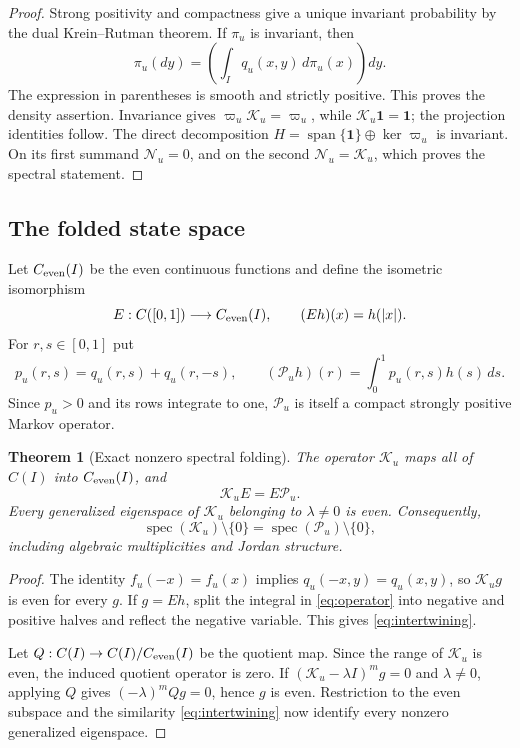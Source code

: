 \documentclass[11pt]{article}
\newtheorem{theorem}{Theorem}[section]
\theoremstyle{definition}
\theoremstyle{remark}
\newcommand{\cK}{\mathcal K}
\newcommand{\cP}{\mathcal P}
\newcommand{\cN}{\mathcal N}
\newcommand{\spec}{\operatorname{spec}}
\newcommand{\one}{\mathbf 1}
\begin{document}
\begin{proof}
Strong positivity and compactness give a unique invariant probability by the
dual Krein--Rutman theorem.  If $\pi_u$ is invariant, then
\[
 \pi_u(dy)=\left(\int_Iq_u(x,y)\,d\pi_u(x)\right)dy.
\]
The expression in parentheses is smooth and strictly positive.  This proves
the density assertion.  Invariance gives $\varpi_u\cK_u=\varpi_u$, while
$\cK_u\one=\one$; the projection identities follow.  The direct decomposition
$H=\operatorname{span}\{\one\}\oplus\ker\varpi_u$ is invariant.  On its first
summand $\cN_u=0$, and on the second $\cN_u=\cK_u$, which proves the spectral
statement.
\end{proof}

\subsection{The folded state space}

Let $C_{\rm even}(I)$ be the even continuous functions and define the
isometric isomorphism
\[
 E:C([0,1])\longrightarrow C_{\rm even}(I),
 \qquad (Eh)(x)=h(|x|).
\]
For $r,s\in[0,1]$ put
\begin{equation}\label{eq:folded-kernel}
 p_u(r,s)=q_u(r,s)+q_u(r,-s),
 \qquad
 (\cP_u h)(r)=\int_0^1p_u(r,s)h(s)\,ds.
\end{equation}
Since $p_u>0$ and its rows integrate to one, $\cP_u$ is itself a compact
strongly positive Markov operator.

\begin{theorem}[Exact nonzero spectral folding]
\label{thm:folding}
The operator $\cK_u$ maps all of $C(I)$ into $C_{\rm even}(I)$, and
\begin{equation}\label{eq:intertwining}
 \cK_uE=E\cP_u.
\end{equation}
Every generalized eigenspace of $\cK_u$ belonging to $\lambda\ne0$ is even.
Consequently,
\begin{equation}\label{eq:folded-spectrum}
 \spec(\cK_u)\setminus\{0\}
 =\spec(\cP_u)\setminus\{0\},
\end{equation}
including algebraic multiplicities and Jordan structure.
\end{theorem}

\begin{proof}
The identity $f_u(-x)=f_u(x)$ implies
$q_u(-x,y)=q_u(x,y)$, so $\cK_ug$ is even for every $g$.  If $g=Eh$, split
the integral in \eqref{eq:operator} into negative and positive halves and
reflect the negative variable.  This gives \eqref{eq:intertwining}.

Let $Q:C(I)\to C(I)/C_{\rm even}(I)$ be the quotient map.  Since the range of
$\cK_u$ is even, the induced quotient operator is zero.  If
$(\cK_u-\lambda I)^m g=0$ and $\lambda\ne0$, applying $Q$ gives
$(-\lambda)^mQg=0$, hence $g$ is even.  Restriction to the even subspace and
the similarity \eqref{eq:intertwining} now identify every nonzero generalized
eigenspace.
\end{proof}
\end{document}

